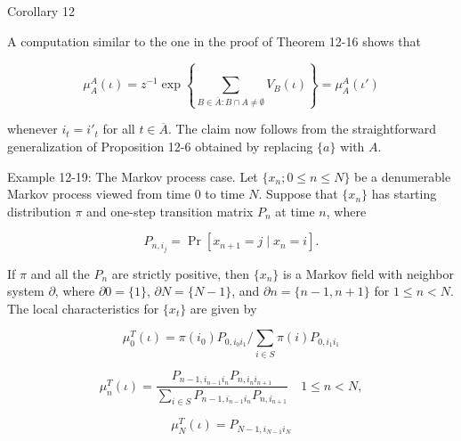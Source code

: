 Corollary 12

A computation similar to the one in the proof of Theorem 12-16 shows that

$$\mu_A^A(\iota) = z^{-1} \exp \left\{ \sum_{B \in \overline{A}: B \cap A \neq \emptyset} V_B(\iota) \right\} = \mu_A^A(\iota')$$

whenever $i_t = i'_t$ for all $t \in \overline{A}$. The claim now follows from the straightforward generalization of Proposition 12-6 obtained by replacing $\{a\}$ with $A$.

Example 12-19: The Markov process case. Let $\{x_n; 0 \leq n \leq N\}$ be a denumerable Markov process viewed from time 0 to time $N$. Suppose that $\{x_n\}$ has starting distribution $\pi$ and one-step transition matrix $P_n$ at time $n$, where

$$P_{n,i_j} = \Pr[x_{n+1} = j \mid x_n = i].$$

If $\pi$ and all the $P_n$ are strictly positive, then $\{x_n\}$ is a Markov field with neighbor system $\partial$, where $\partial 0 = \{1\}$, $\partial N = \{N-1\}$, and $\partial n = \{n-1, n+1\}$ for $1 \leq n < N$. The local characteristics for $\{x_t\}$ are given by

$$\mu_0^T(\iota) = \pi(i_0) P_{0,i_0 i_1} / \sum_{i \in S} \pi(i) P_{0,i_1 i_1}$$

$$\mu_n^T(\iota) = \frac{P_{n-1,i_{n-1} i_n} P_{n,i_n i_{n+1}}}{\sum_{i \in S} P_{n-1,i_{n-1} i_n} P_{n,i_{n+1}}} \quad 1 \leq n < N,$$

$$\mu_N^T(\iota) = P_{N-1,i_{N-1} i_N}$$
